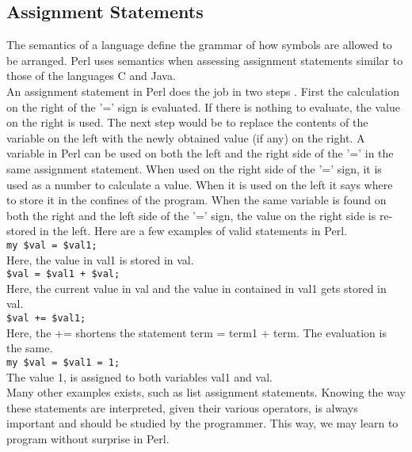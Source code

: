 \documentclass[11pt,a4paper]{article}
\begin{document}
\subsection{Assignment Statements}
The semantics of a language define the grammar of how symbols are allowed to be arranged. Perl uses semantics when assessing assignment statements similar to those of the languages C and Java. \\

\noindent An assignment statement in Perl does the job in two steps\cite{16} . First the calculation on the right of the '=' sign is evaluated. If there is nothing to evaluate, the value on the right is used. The next step would be to replace the contents of the variable on the left with the newly obtained value (if any) on the right. A variable in Perl can be used on both the left and the right side of the '=' in the same assignment statement. When used on the right side of the '=' sign, it is used as a number to calculate a value. When it is used on the left it says where to store it in the confines of the program. When the same variable is found on both the right and the left side of the '=' sign, the value on the right side is re-stored in the left. Here are a few examples of valid statements in Perl.\\


\texttt{my \$val = \$val1;}\\

\noindent Here, the value in val1 is stored in val.\\

\texttt{\$val = \$val1 + \$val;}\\

\noindent Here, the current value in val and the value in contained in val1 gets stored in val.\\

\texttt{\$val += \$val1;}\\

\nonindent Here, the += shortens the statement term = term1 + term. The evaluation is the same.\\

\texttt{my \$val = \$val1 = 1;}\\

\noindent The value 1, is assigned to both variables val1 and val.\\

\noindent Many other examples exists, such as list assignment statements. Knowing the way these statements are interpreted, given their various operators, is always important and should be studied by the programmer. This way, we may learn to program without surprise in Perl.
\end{document}
